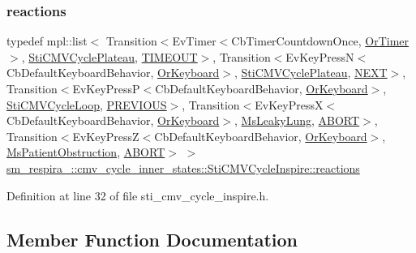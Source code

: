 \subsubsection{\texorpdfstring{reactions}{reactions}}
{\footnotesize\ttfamily typedef mpl\+::list$<$ Transition$<$Ev\+Timer$<$Cb\+Timer\+Countdown\+Once, \hyperlink{classsm__respira__1_1_1OrTimer}{Or\+Timer}$>$, \hyperlink{structsm__respira__1_1_1cmv__cycle__inner__states_1_1StiCMVCyclePlateau}{Sti\+C\+M\+V\+Cycle\+Plateau}, \hyperlink{structsm__respira__1_1_1cmv__cycle__inner__states_1_1StiCMVCycleInspire_1_1TIMEOUT}{T\+I\+M\+E\+O\+UT}$>$, Transition$<$Ev\+Key\+PressN$<$Cb\+Default\+Keyboard\+Behavior, \hyperlink{classsm__respira__1_1_1OrKeyboard}{Or\+Keyboard}$>$, \hyperlink{structsm__respira__1_1_1cmv__cycle__inner__states_1_1StiCMVCyclePlateau}{Sti\+C\+M\+V\+Cycle\+Plateau}, \hyperlink{structsm__respira__1_1_1cmv__cycle__inner__states_1_1StiCMVCycleInspire_1_1NEXT}{N\+E\+XT}$>$, Transition$<$Ev\+Key\+PressP$<$Cb\+Default\+Keyboard\+Behavior, \hyperlink{classsm__respira__1_1_1OrKeyboard}{Or\+Keyboard}$>$, \hyperlink{structsm__respira__1_1_1cmv__cycle__inner__states_1_1StiCMVCycleLoop}{Sti\+C\+M\+V\+Cycle\+Loop}, \hyperlink{structsm__respira__1_1_1cmv__cycle__inner__states_1_1StiCMVCycleInspire_1_1PREVIOUS}{P\+R\+E\+V\+I\+O\+US}$>$, Transition$<$Ev\+Key\+PressX$<$Cb\+Default\+Keyboard\+Behavior, \hyperlink{classsm__respira__1_1_1OrKeyboard}{Or\+Keyboard}$>$, \hyperlink{classsm__respira__1_1_1MsLeakyLung}{Ms\+Leaky\+Lung}, \hyperlink{classABORT}{A\+B\+O\+RT}$>$, Transition$<$Ev\+Key\+PressZ$<$Cb\+Default\+Keyboard\+Behavior, \hyperlink{classsm__respira__1_1_1OrKeyboard}{Or\+Keyboard}$>$, \hyperlink{classsm__respira__1_1_1MsPatientObstruction}{Ms\+Patient\+Obstruction}, \hyperlink{classABORT}{A\+B\+O\+RT}$>$ $>$ \hyperlink{structsm__respira__1_1_1cmv__cycle__inner__states_1_1StiCMVCycleInspire_a47f067e4ae99b039d4a79cf2bb1e1aef}{sm\+\_\+respira\+\_\+::cmv\+\_\+cycle\+\_\+inner\+\_\+states\+::\+Sti\+C\+M\+V\+Cycle\+Inspire\+::reactions}}



Definition at line 32 of file sti\+\_\+cmv\+\_\+cycle\+\_\+inspire.\+h.



\subsection{Member Function Documentation}
\mbox{\label{structsm__respira__1_1_1cmv__cycle__inner__states_1_1StiCMVCycleInspire_a7ea84a07cb161a9963b7a0ef862d55da}} 
